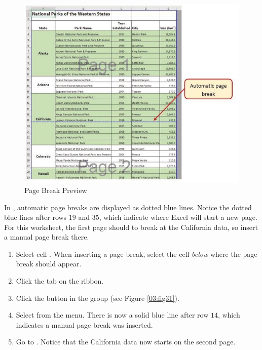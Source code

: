 \begin{figure}[H]
	\centering
	\includegraphics[width=\maxwidth{.95\linewidth}]{gfx/ch03_fig30}
	\caption{Page Break Preview}
	\label{03:fig30}
\end{figure}

In , automatic page breaks are displayed as dotted blue lines. Notice the dotted blue lines after rows $ 19 $ and $ 35 $, which indicate where Excel will start a new page. For this worksheet, the first page should to break at the California data, so insert a manual page break there.

\begin{enumerate}
	\item Select cell . When inserting a page break, select the cell \textit{below} where the page break should appear.
	\item Click the  tab on the ribbon.
	\item Click the  button in the  group (see Figure \ref{03:fig31}).
	\item Select  from the menu. There is now a solid blue line after row $ 14 $, which indicates a manual page break was inserted.
	\item Go to . Notice that the California data now starts on the second page.
\end{enumerate}

